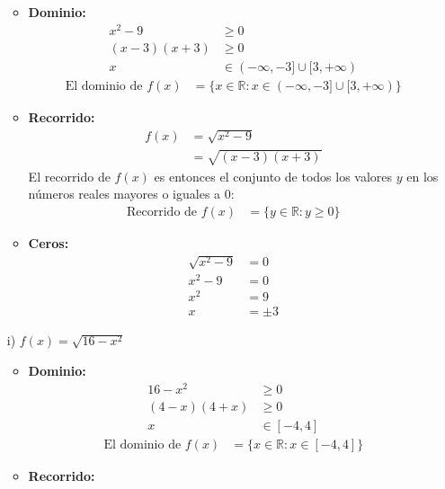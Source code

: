 \documentclass{templateNote}
\begin{document}
\begin{itemize}
    \begin{itemize}
        \item \textbf{Dominio:}
        \begin{align*}
            x^2 - 9 &\geq 0 \\
            (x - 3)(x + 3) &\geq 0 \\
            x &\in (-\infty, -3] \cup [3, +\infty)
        \end{align*}
        \begin{align*}
            \text{El dominio de } f(x) &= \{x \in \mathbb{R} : x \in (-\infty, -3] \cup [3, +\infty)\}
        \end{align*}
        \item \textbf{Recorrido:}
        \begin{align*}
            f(x) &= \sqrt{x^2 - 9} \\
            &= \sqrt{(x - 3)(x + 3)}
        \end{align*}
        El recorrido de \( f(x) \) es entonces el conjunto de todos los valores \( y \) en los números reales mayores o iguales a 0:
        \begin{align*}
            \text{Recorrido de } f(x) &= \{y \in \mathbb{R} : y \geq 0\}
        \end{align*}
        \item \textbf{Ceros:}
        \begin{align*}
            \sqrt{x^2 - 9} &= 0 \\
            x^2 - 9 &= 0 \\
            x^2 &= 9 \\
            x &= \pm 3
        \end{align*}
    \end{itemize}
    \item[i)] $f(x) = \sqrt{16 - x^2}$
    \begin{itemize}
        \item \textbf{Dominio:}
        \begin{align*}
            16 - x^2 &\geq 0 \\
            (4 - x)(4 + x) &\geq 0 \\
            x &\in [-4, 4]
        \end{align*}
        \begin{align*}
            \text{El dominio de } f(x) &= \{x \in \mathbb{R} : x \in [-4, 4]\}
        \end{align*}
        \item \textbf{Recorrido:}
        \begin{align*}

\end{align*}
\end{itemize}
\end{itemize}
\end{document}
